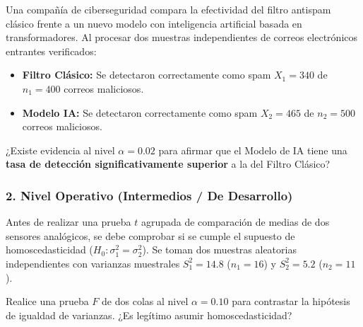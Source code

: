 \begin{problema}
	\label{prob:doc_dos_proporciones}
	Una compañía de ciberseguridad compara la efectividad del filtro antispam clásico frente a un nuevo modelo con inteligencia artificial basada en transformadores. Al procesar dos muestras independientes de correos electrónicos entrantes verificados:
	\begin{itemize}
		\item \textbf{Filtro Clásico:} Se detectaron correctamente como spam $X_1 = 340$ de $n_1 = 400$ correos maliciosos.
		\item \textbf{Modelo IA:} Se detectaron correctamente como spam $X_2 = 465$ de $n_2 = 500$ correos maliciosos.
	\end{itemize}
	¿Existe evidencia al nivel $\alpha = 0.02$ para afirmar que el Modelo de IA tiene una \textbf{tasa de detección significativamente superior} a la del Filtro Clásico?
\end{problema}

\subsubsection*{2. Nivel Operativo (Intermedios / De Desarrollo)}

\begin{problema}
	\label{prob:doc_dos_varianzas}
	Antes de realizar una prueba $t$ agrupada de comparación de medias de dos sensores analógicos, se debe comprobar si se cumple el supuesto de homoscedasticidad ($H_0: \sigma_1^2 = \sigma_2^2$). Se toman dos muestras aleatorias independientes con varianzas muestrales $S_1^2 = 14.8$ ($n_1 = 16$) y $S_2^2 = 5.2$ ($n_2 = 11$).
	
	Realice una prueba $F$ de dos colas al nivel $\alpha = 0.10$ para contrastar la hipótesis de igualdad de varianzas. ¿Es legítimo asumir homoscedasticidad?
\end{problema}

